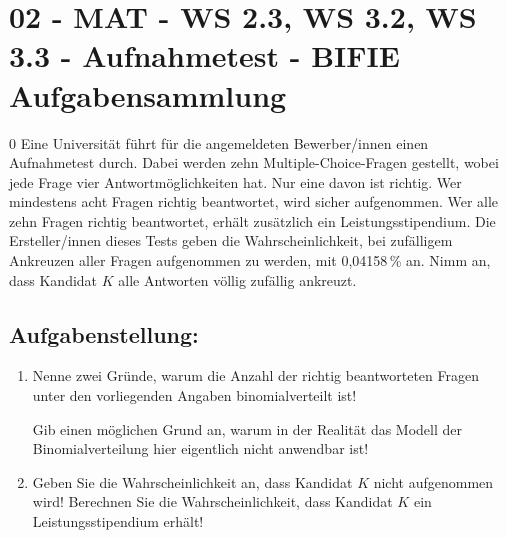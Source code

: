 \section{02 - MAT - WS 2.3, WS 3.2, WS 3.3 - Aufnahmetest - BIFIE Aufgabensammlung}

\begin{langesbeispiel} \item[0] %
Eine Universität führt für die angemeldeten Bewerber/innen einen Aufnahmetest durch. Dabei werden zehn Multiple-Choice-Fragen gestellt, wobei jede Frage vier Antwortmöglichkeiten hat.
Nur eine davon ist richtig. Wer mindestens acht Fragen richtig beantwortet, wird sicher aufgenommen. Wer alle zehn Fragen richtig beantwortet, erhält zusätzlich ein Leistungsstipendium.
Die Ersteller/innen dieses Tests geben die Wahrscheinlichkeit, bei zufälligem Ankreuzen aller Fragen aufgenommen zu werden, mit 0,04158\,\% an. Nimm an, dass Kandidat $K$ alle
Antworten völlig zufällig ankreuzt.

\subsection{Aufgabenstellung:}

\begin{enumerate}
	\item Nenne zwei Gründe, warum die Anzahl der richtig beantworteten Fragen unter den vorliegenden Angaben binomialverteilt ist! 
	
Gib einen möglichen Grund an, warum in der Realität das Modell der Binomialverteilung hier eigentlich nicht anwendbar ist!
	
	\item Geben Sie die Wahrscheinlichkeit an, dass Kandidat $K$ nicht aufgenommen wird! Berechnen Sie die Wahrscheinlichkeit, dass Kandidat $K$ ein Leistungsstipendium erhält!
\end{enumerate}

\end{langesbeispiel}
